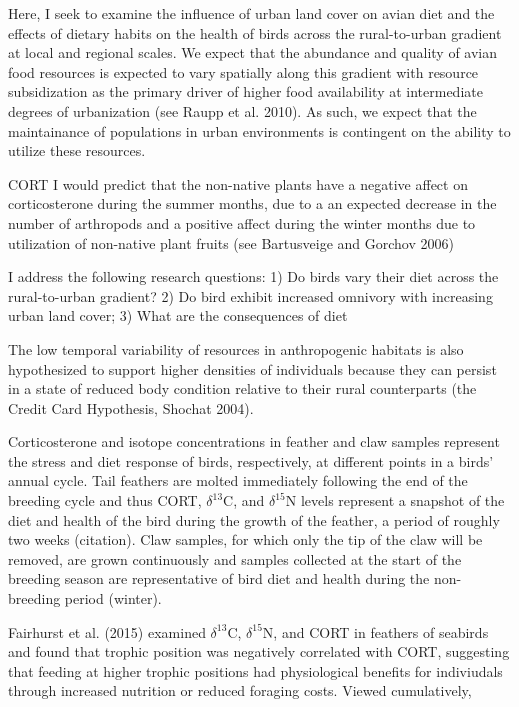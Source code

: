\documentclass[12pt]{article}
\begin{document}

 Here, I seek to examine the influence of urban land cover on avian diet and the effects of dietary habits on the health of birds across the rural-to-urban gradient at local and regional scales. We expect that the abundance and quality of avian food resources is expected to vary spatially along this gradient with resource subsidization as the primary driver of higher food availability at intermediate degrees of urbanization (see Raupp et al. 2010). As such, we expect that the maintainance of populations in urban environments is contingent on the ability to utilize these resources.  

CORT
I would predict that the non-native plants have a negative affect on corticosterone during the summer months, due to a an expected decrease in the number of arthropods and a positive affect during the winter months due to utilization of non-native plant fruits (see Bartusveige and Gorchov 2006)

I address the following research questions: 1) Do birds vary their diet across the rural-to-urban gradient? 2) Do bird exhibit increased omnivory with increasing urban land cover; 3) What are the consequences of diet

The low temporal variability of resources in anthropogenic habitats is also hypothesized to support higher densities of individuals because they can persist in a state of reduced body condition relative to their rural counterparts (the Credit Card Hypothesis, Shochat 2004). 

Corticosterone and isotope concentrations in feather and claw samples represent the stress and diet response of birds, respectively, at different points in a birds' annual cycle. Tail feathers are molted immediately following the end of the breeding cycle and thus CORT, $\delta^{13}$C, and $\delta^{15}$N levels represent a snapshot of the diet and health of the bird during the growth of the feather, a period of roughly two weeks (citation). Claw samples, for which only the tip of the claw will be removed, are grown continuously and samples collected at the start of the breeding season are representative of bird diet and health during the non-breeding period (winter). 


\par

Fairhurst et al. (2015) examined $\delta^{13}$C,  $\delta^{15}$N, and CORT in feathers of seabirds and found that trophic position was negatively correlated with CORT, suggesting that feeding at higher trophic positions had physiological benefits for indiviudals through increased nutrition or reduced foraging costs.
Viewed cumulatively, \par
\end{document}

